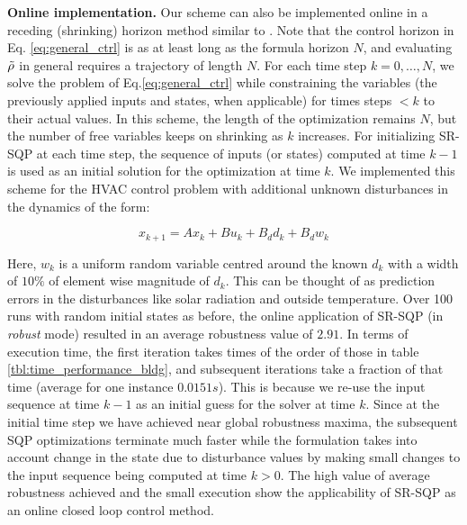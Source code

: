 \textbf{Online implementation.} Our scheme can also be implemented online in a receding (shrinking) horizon method similar to \cite{Raman14_MPCSTL}. Note that the control horizon in Eq. \ref{eq:general_ctrl} is as at least long as the formula horizon $N$, and evaluating $\tilde{\rho}$ in general requires a trajectory of length $N$. 
For each time step $k=0,\dotsc,N$, we solve the problem of Eq.\ref{eq:general_ctrl} while constraining the variables (the previously applied inputs and states, when applicable) for times steps $<k$ to their actual values. In this scheme, the length of the optimization remains $N$, but the number of free variables keeps on shrinking as $k$ increases. For initializing SR-SQP at each time step, the sequence of inputs (or states) computed at time $k-1$ is used as an initial solution for the optimization at time $k$. 
We implemented this scheme for the HVAC control problem with additional unknown disturbances in the dynamics of the form:
  
\begin{equation}
\label{eq:bldg_dyn_noisy}
x_{k+1} = Ax_{k}+Bu_k+B_dd_k+B_dw_k
\end{equation}

Here, $w_k$ is a uniform random variable centred around the known $d_k$ with a width of $10\%$ of element wise magnitude of $d_k$. This can be thought of as prediction errors in the disturbances like solar radiation and outside temperature. Over 100 runs with random initial states as before, the online application of SR-SQP (in \textit{robust} mode) resulted in an average robustness value of $2.91$. In terms of execution time, the first iteration takes times of the order of those in table \ref{tbl:time_performance_bldg}, and subsequent iterations take a fraction of that time (average for one instance $0.0151s$). This is because we re-use the input sequence at time $k-1$ as an initial guess for the solver at time $k$. Since at the initial time step we have achieved near global robustness maxima, the subsequent SQP optimizations terminate much faster while the formulation takes into account change in the state due to disturbance values by making small changes to the input sequence being computed at time $k>0$. The high value of average robustness achieved and the small execution show the applicability of SR-SQP as an online closed loop control method. 

